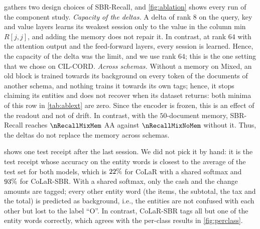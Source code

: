 \begin{table}[t]
\centering\small
\setlength{\tabcolsep}{3pt}
\caption{\textbf{Design choices of SBR-Recall} (AA, mean $\pm$ s.d.\ of three runs): the capacity of the deltas on CIL-CORD and the memory across schemas on Mixed. Min $R[j,j]$: the lowest F1 of a session right after it is learned; min $R[T,j]$: the lowest final F1 of a session, both over all runs.}
\label{tab:ablext}
\resizebox{\linewidth}{!}{}
\end{table}

  gathers two design choices of SBR-Recall, and \cref{fig:ablation} shows every run of the component study. \emph{Capacity of the deltas.} A delta of rank $8$ on the query, key and value layers learns its weakest session only to the value in the column min $R[j,j]$, and adding the memory does not repair it. In contrast, at rank $64$ with the attention output and the feed-forward layers, every session is learned. Hence, the capacity of the delta was the limit, and we use rank $64$; this is the one setting that we chose on CIL-CORD. \emph{Across schemas.} Without a memory on Mixed, an old block is trained towards its background on every token of the documents of another schema, and nothing trains it towards its own tags; hence, it stops claiming its entities and does not recover when its dataset returns: both minima of this row in \cref{tab:ablext} are zero. Since the encoder is frozen, this is an effect of the readout and not of drift. In contrast, with the $50$-document memory, SBR-Recall reaches $\nRecallMixMem$ AA against $\nRecallMixNoMem$ without it. Thus, the deltas do not replace the memory across schemas.

  shows one test receipt after the last session. We did not pick it by hand: it is the test receipt whose accuracy on the entity words is closest to the average of the test set for both models, which is $22\%$ for CoLaR with a shared softmax and $93\%$ for CoLaR-SBR. With a shared softmax, only the cash and the change amounts are tagged; every other entity word (the items, the subtotal, the tax and the total) is predicted as background, i.e., the entities are not confused with each other but lost to the label ``O''. In contrast, CoLaR-SBR tags all but one of the entity words correctly, which agrees with the per-class results in \cref{fig:perclass}.

\begin{table}[t]
\centering\small
\setlength{\tabcolsep}{5pt}
\caption{\textbf{Memory size} on CIL-CORD (mean $\pm$ s.d.\ of three runs; bold: the default size).}
\label{tab:budget}
\resizebox{\linewidth}{!}{}
\end{table}

